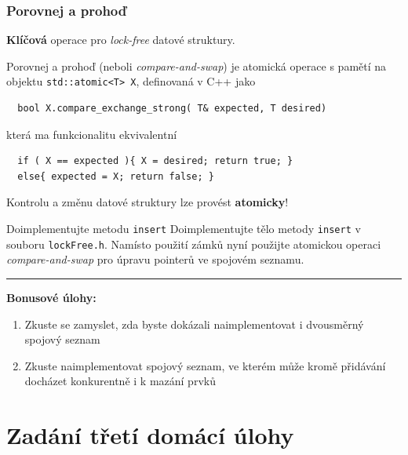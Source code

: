 \documentclass[usenames,dvipsnames,9pt]{beamer}
\begin{document}
\begin{frame}[fragile]
  \frametitle{Porovnej a prohoď}
  \textbf{Klíčová} operace pro \emph{lock-free} datové struktury.
  \vspace{2em}

  Porovnej a prohoď (neboli \textit{compare-and-swap}) je atomická operace s pamětí na objektu \texttt{std::atomic<T> X}, definovaná v C++ jako 

  \begin{verbatim}
  bool X.compare_exchange_strong( T& expected, T desired)
  \end{verbatim}
  
  která ma funkcionalitu ekvivalentní 
  
  \begin{verbatim}
  if ( X == expected ){ X = desired; return true; }
  else{ expected = X; return false; }
  \end{verbatim}
  
  \pause\vspace{1em}
  
  Kontrolu a změnu datové struktury lze provést {\bf atomicky}!

\end{frame}

{
\begin{frame}[fragile]
  \begin{block}{Doimplementujte metodu \texttt{insert}}
    Doimplementujte tělo metody \texttt{insert} v souboru \texttt{lockFree.h}.
    Namísto použití zámků nyní použijte atomickou operaci \emph{compare-and-swap} pro úpravu pointerů ve spojovém seznamu.
  \end{block}

  \vspace{2em}\hrule\vspace{2em}
  \pause
  \textbf{Bonusové úlohy:}
  \begin{enumerate}
    \item Zkuste se zamyslet, zda byste dokázali naimplementovat i dvousměrný spojový seznam
    \item Zkuste naimplementovat spojový seznam, ve kterém může kromě přidávání docházet konkurentně i k mazání prvků
  \end{enumerate}
\end{frame}
}


\section{Zadání třetí domácí úlohy}
\end{document}
